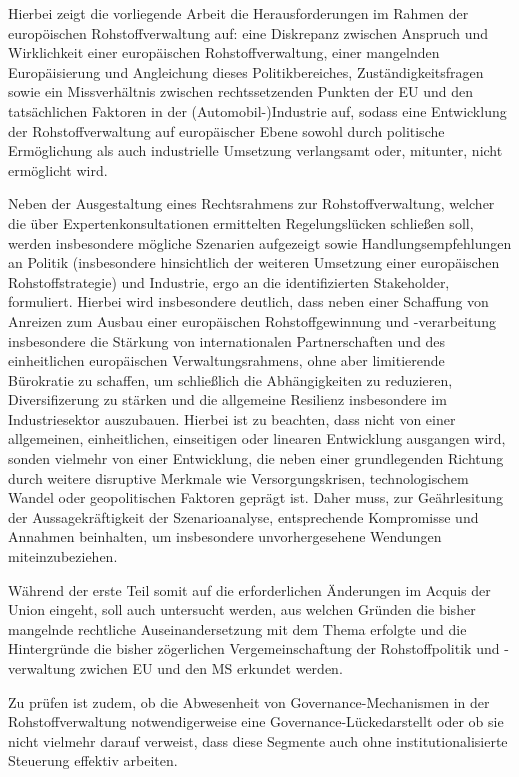 \documentclass[12pt,a4paper,oneside]{book} %
\begin{document}
Hierbei zeigt die vorliegende Arbeit die Herausforderungen im Rahmen der europöischen Rohstoffverwaltung auf: eine Diskrepanz zwischen Anspruch und Wirklichkeit einer europäischen Rohstoffverwaltung, einer mangelnden Europäisierung und Angleichung dieses Politikbereiches, Zuständigkeitsfragen sowie ein Missverhältnis zwischen rechtssetzenden Punkten der EU und den tatsächlichen Faktoren in der (Automobil-)Industrie auf, sodass eine Entwicklung der Rohstoffverwaltung auf europäischer Ebene sowohl durch politische Ermöglichung als auch industrielle Umsetzung verlangsamt oder, mitunter, nicht ermöglicht wird.

Neben der Ausgestaltung eines Rechtsrahmens zur Rohstoffverwaltung, welcher die über Expertenkonsultationen ermittelten Regelungslücken schließen soll, werden insbesondere mögliche Szenarien aufgezeigt sowie Handlungsempfehlungen an Politik (insbesondere hinsichtlich der weiteren Umsetzung einer europäischen Rohstoffstrategie) und Industrie, ergo an die identifizierten Stakeholder, formuliert. Hierbei wird insbesondere deutlich, dass neben einer Schaffung von Anreizen zum Ausbau einer europäischen Rohstoffgewinnung und -verarbeitung insbesondere die Stärkung von internationalen Partnerschaften und des einheitlichen europäischen Verwaltungsrahmens, ohne aber limitierende Bürokratie zu schaffen, um schließlich die Abhängigkeiten zu reduzieren, Diversifizerung zu stärken und die allgemeine Resilienz insbesondere im Industriesektor auszubauen. Hierbei ist zu beachten, dass nicht von einer allgemeinen, einheitlichen, einseitigen oder linearen Entwicklung ausgangen wird, sonden vielmehr von einer Entwicklung, die neben einer grundlegenden Richtung durch weitere disruptive Merkmale wie Versorgungskrisen, technologischem Wandel oder geopolitischen Faktoren geprägt ist. Daher muss, zur Geährlesitung der Aussagekräftigkeit der Szenarioanalyse, entsprechende Kompromisse und Annahmen beinhalten, um insbesondere unvorhergesehene Wendungen miteinzubeziehen.   

Während der erste Teil somit auf die erforderlichen Änderungen im Acquis der Union eingeht, soll auch untersucht werden, aus welchen Gründen die bisher mangelnde rechtliche Auseinandersetzung mit dem Thema erfolgte und die Hintergründe die bisher zögerlichen Vergemeinschaftung der Rohstoffpolitik und -verwaltung zwichen EU und den MS erkundet werden.

Zu prüfen ist zudem, ob die Abwesenheit von Governance-Mechanismen in der Rohstoffverwaltung notwendigerweise eine \glqq Governance-Lücke\grqq  darstellt oder ob sie nicht vielmehr darauf verweist, dass diese Segmente auch ohne institutionalisierte Steuerung effektiv arbeiten.
\end{document}
